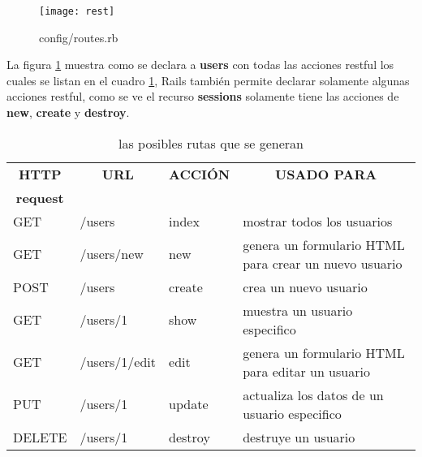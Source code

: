       \begin{figure}[!hbp]
        \begin{center}
          \texttt{[image: rest]}
        \end{center}
        \caption[REST - routes.rb]{config/routes.rb}
        \label{fig:rest}
      \end{figure}

      La figura \ref{fig:rest} muestra como se declara a \textbf{users} con 
      todas las acciones restful los cuales se listan en el cuadro \ref{tab:rest},  
      Rails también permite declarar solamente algunas acciones restful,
      como se ve el recurso \textbf{sessions} solamente tiene las acciones de \textbf{new}, \textbf{create} y \textbf{destroy}.\\
     

      \begin{table}[!hbp]
        \label{tab:rest}
        \begin{center}
          \begin{tabular}{ l l l  p{5cm} }
            \toprule
            \multicolumn{1}{c}{\textbf{HTTP}} & 
            \multicolumn{1}{c}{\textbf{URL}}  & 
            \multicolumn{1}{c}{\textbf{ACCI\'ON}} &
            \multicolumn{1}{c}{\textbf{USADO PARA}}  \\
            \multicolumn{1}{c}{\textbf{request}} & & & \\

            \midrule
            GET     &   /users         &   index    & mostrar todos los usuarios\\ %
            GET     &   /users/new     &   new      & genera un formulario HTML para crear un nuevo usuario \\
            POST    &   /users         &   create   & crea un nuevo usuario\\
            GET     &   /users/1       &   show     & muestra un usuario especifico\\
            GET     &   /users/1/edit  &   edit     & genera un formulario HTML para editar un usuario\\
            PUT     &   /users/1       &   update   & actualiza los datos de un usuario especifico\\
            DELETE  &   /users/1       &   destroy  & destruye un usuario\\
            \bottomrule
          \end{tabular}
          \caption[recursos REST]{las posibles rutas que se generan}
        \end{center}
      \end{table}

